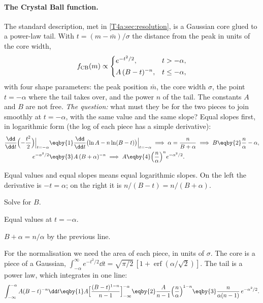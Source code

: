 \paragraph{The Crystal Ball function.}
The standard description, met in \cref{T4a:sec:resolution}, is a Gaussian core glued to a
power-law tail. With
$t=(m-\bar m)/\sigma$ the distance from the peak in units of the core width,
\begin{equation}
  f_{\rm CB}(m)\propto
  \begin{cases}
    e^{-t^2/2}, & t>-\alpha,\\[2pt]
    A\,(B-t)^{-n}, & t\le-\alpha,
  \end{cases}
  \label{13d:eq:cb}
\end{equation}
with four shape parameters: the peak position $\bar m$, the core width $\sigma$, the point
$t=-\alpha$ where the tail takes over, and the power $n$ of the tail. The constants $A$
and $B$ are not free. \emph{The question:} what must they be for the two pieces to join
smoothly at $t=-\alpha$, with the same value and the same slope? Equal slopes first, in
logarithmic form (the log of each piece has a simple derivative):
\begin{align}
  \frac{\dd}{\dd t}\Bigl(-\frac{t^2}{2}\Bigr)\Big|_{t=-\alpha}
  &\eqby{1} \frac{\dd}{\dd t}\bigl(\ln A-n\ln(B-t)\bigr)\Big|_{t=-\alpha}
  \;\Longrightarrow\;
  \alpha=\frac{n}{B+\alpha}
  \;\Longrightarrow\;
  B\eqby{2}\frac{n}{\alpha}-\alpha,
  \nonumber\\
  e^{-\alpha^2/2}
  &\eqby{3} A\,(B+\alpha)^{-n}
  \;\Longrightarrow\;
  A\eqby{4}\Bigl(\frac{n}{\alpha}\Bigr)^{n}e^{-\alpha^2/2}.
  \label{13d:eq:cb-AB}
\end{align}
\begin{explain}
  \item Equal values and equal slopes means equal logarithmic slopes. On the left the
        derivative is $-t=\alpha$; on the right it is $n/(B-t)=n/(B+\alpha)$.
  \item Solve for $B$.
  \item Equal values at $t=-\alpha$.
  \item $B+\alpha=n/\alpha$ by the previous line.
\end{explain}
For the normalisation we need the area of each piece, in units of $\sigma$. The core is a
piece of a Gaussian, $\int_{-\alpha}^{\infty}e^{-t^2/2}\dd t=\sqrt{\pi/2}\,[1+\operatorname{erf}(\alpha/\sqrt2)]$.
The tail is a power law, which integrates in one line:
\begin{align}
  \int_{-\infty}^{-\alpha}A(B-t)^{-n}\dd t
  \eqby{1} A\Bigl[\frac{(B-t)^{1-n}}{n-1}\Bigr]_{-\infty}^{-\alpha}
  \eqby{2} \frac{A}{n-1}\Bigl(\frac{n}{\alpha}\Bigr)^{1-n}
  \eqby{3} \frac{n}{\alpha(n-1)}\,e^{-\alpha^2/2} .
  \label{13d:eq:cb-tail}
\end{align}
